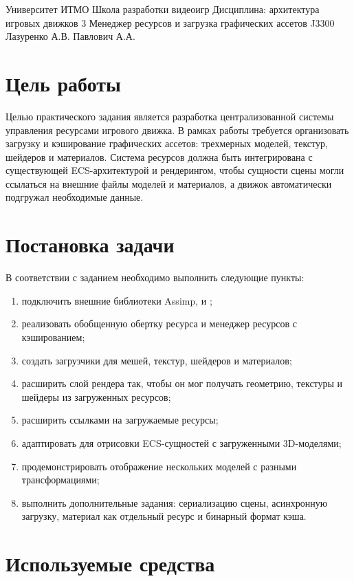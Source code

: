\documentclass[14pt,a4paper]{extarticle}
\newcommand{\university}{Университет ИТМО}
\newcommand{\faculty}{Школа разработки видеоигр}
\newcommand{\discipline}{Дисциплина: архитектура игровых движков}
\newcommand{\worknumber}{3}
\newcommand{\worktheme}{Менеджер ресурсов и загрузка графических ассетов}
\newcommand{\studentgroup}{J3300}
\newcommand{\studentname}{Лазуренко А.В.}
\newcommand{\teachername}{Павлович А.А.}
\begin{document}
\gosttitlepage
  {\university}
  {\faculty}
  {\discipline}
  {\worknumber}
  {\worktheme}
  {\studentgroup}
  {\studentname}
  {\teachername}

\tableofcontents
\newpage

\section{Цель работы}

Целью практического задания является разработка централизованной системы управления ресурсами игрового
движка. В рамках работы требуется организовать загрузку и кэширование графических ассетов: трехмерных
моделей, текстур, шейдеров и материалов. Система ресурсов должна быть интегрирована с существующей
ECS-архитектурой и рендерингом, чтобы сущности сцены могли ссылаться на внешние файлы моделей и материалов,
а движок автоматически подгружал необходимые данные.

\section{Постановка задачи}

В соответствии с заданием необходимо выполнить следующие пункты:

\begin{enumerate}
  \item подключить внешние библиотеки Assimp,  и ;
  \item реализовать обобщенную обертку ресурса и менеджер ресурсов с кэшированием;
  \item создать загрузчики для мешей, текстур, шейдеров и материалов;
  \item расширить слой рендера так, чтобы он мог получать геометрию, текстуры и шейдеры из загруженных ресурсов;
  \item расширить  ссылками на загружаемые ресурсы;
  \item адаптировать  для отрисовки ECS-сущностей с загруженными 3D-моделями;
  \item продемонстрировать отображение нескольких моделей с разными трансформациями;
  \item выполнить дополнительные задания: сериализацию сцены, асинхронную загрузку, материал как отдельный ресурс и бинарный формат кэша.
\end{enumerate}

\section{Используемые средства}
\end{document}
